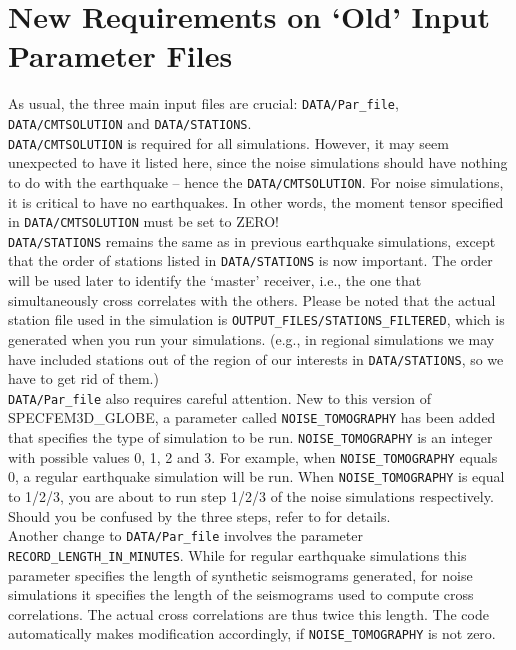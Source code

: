 \documentclass[oneside,english]{book}
\begin{document}
\section{New Requirements on `Old' Input Parameter Files}

As usual, the three main input files are crucial: \texttt{DATA/Par\_file}, \texttt{DATA/CMTSOLUTION} and
\texttt{DATA/STATIONS}.\\

\texttt{DATA/CMTSOLUTION} is required for all simulations. However, it may seem unexpected to have it listed here, since the
noise simulations should have nothing to do with the earthquake -- hence the \texttt{DATA/CMTSOLUTION}.
For noise simulations, it is critical to have no earthquakes. In other words, the moment tensor
specified in \texttt{DATA/CMTSOLUTION} must be set to ZERO! \\

\texttt{DATA/STATIONS} remains the same as in previous earthquake simulations,
except that the order of stations listed in \texttt{DATA/STATIONS} is now important.
The order will be used later to identify the `master' receiver,
i.e., the one that simultaneously cross correlates with the others.
Please be noted that the actual station file used in the simulation is \texttt{OUTPUT\_FILES/STATIONS\_FILTERED},
which is generated when you run your simulations. (e.g., in regional simulations we may have included stations out of the
region of our interests in \texttt{DATA/STATIONS}, so we have to get rid of them.)\\

\texttt{DATA/Par\_file} also requires careful attention.
New to this version of SPECFEM3D\_GLOBE, a parameter called \texttt{NOISE\_TOMOGRAPHY} has been added that specifies the type of simulation to be run.
\texttt{NOISE\_TOMOGRAPHY} is an integer with possible values 0, 1, 2 and 3.
For example, when \texttt{NOISE\_TOMOGRAPHY} equals 0, a regular earthquake simulation will be run.
When \texttt{NOISE\_TOMOGRAPHY} is equal to 1/2/3, you are about to run
step 1/2/3 of the noise simulations respectively.
Should you be confused by the three steps, refer to \citet{trompetal2010} for details.\\

Another change to \texttt{DATA/Par\_file} involves the parameter \texttt{RECORD\_LENGTH\_IN\_MINUTES}.
While for regular earthquake simulations this parameter specifies the length of synthetic seismograms generated,
for noise simulations it specifies the length of the seismograms used to compute cross correlations.
The actual cross correlations are thus twice this length.
The code automatically makes modification accordingly, if \texttt{NOISE\_TOMOGRAPHY} is not zero.\\
\end{document}
